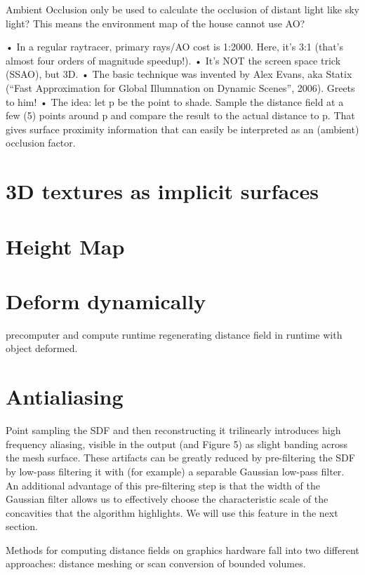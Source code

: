 Ambient Occlusion only be used to calculate the occlusion of distant light like sky light? This means the environment map of the house cannot use AO? 

• In a regular raytracer, primary rays/AO cost is 1:2000. Here, it’s 3:1 (that’s almost four orders of magnitude speedup!).
• It’s NOT the screen space trick (SSAO), but 3D.
• The basic technique was invented by Alex Evans, aka Statix (“Fast Approximation for Global Illumnation on Dynamic Scenes”, 2006). Greets to him!
• The idea: let p be the point to shade. Sample the distance field at a few (5) points around p and compare the result to the actual distance to p. That gives surface proximity information that can easily be interpreted as an (ambient) occlusion factor.

\section*{3D textures as implicit surfaces}
\section*{Height Map}

\section{Deform dynamically}
precomputer and compute runtime
regenerating distance field in runtime with object deformed.

\section*{Antialiasing}

Point sampling the SDF and then reconstructing it trilinearly introduces high frequency aliasing, visible in the output (and Figure 5) as slight banding across the mesh surface. These artifacts can be greatly reduced by pre-filtering the SDF by low-pass filtering it with (for example) a separable Gaussian low-pass filter. An additional advantage of this pre-filtering step is that the width of the Gaussian filter allows us to effectively choose the characteristic scale of the concavities that the algorithm highlights. We will use this feature in the next section.

Methods for computing distance fields on graphics hardware fall into two different approaches: distance meshing or scan conversion of bounded volumes.